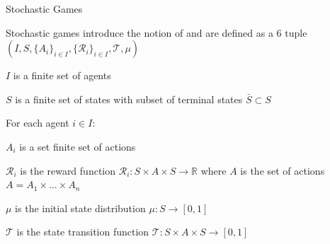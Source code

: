 \begin{frame}{Stochastic Games}

    Stochastic games introduce the notion of  and are defined as a 6 tuple \((I, S, \{A_i\}_{i \in I}, \{\mathcal{R}_i\}_{i \in I}, \mathcal{T}, \mu)\)
    \vspace{10pt}
    \blist
        \item $I$ is a finite set of agents
        \item $S$ is a finite set of states with subset of terminal states $\bar{S} \subset S$
        \item For each agent $i \in I$:
        \blist
            \item $A_i$ is a set finite set of actions
            \item $\mathcal{R}_i$ is the reward function $\mathcal{R}_i : S \times A \times S \to \mathbb{R}$ where $A$ is the set of  actions $A = A_1 \times ... \times A_n$
        \elist
        \item $\mu$ is the initial state distribution $\mu: S \to [0, 1]$
        \item $\mathcal{T}$ is the state transition function $\mathcal{T}: S \times A \times S \to [0, 1]$
    \elist

\end{frame}


